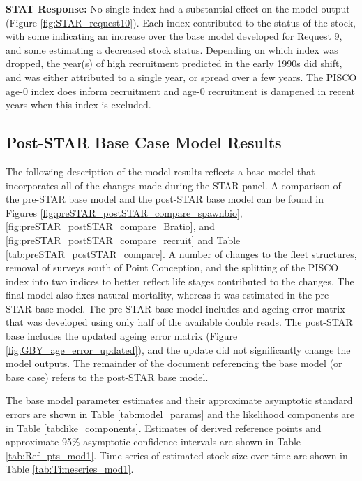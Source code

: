 \documentclass[12pt,]{article}
\begin{document}
\begin{description}[style=sameline]
\textbf{STAT Response:} No single index had a substantial effect on the model output 
(Figure \ref{fig:STAR_request10}). 
Each index contributed to the status of the stock, with some indicating an increase 
over the base model developed for Request 9, and some estimating a decreased stock status. 
Depending on which index was dropped, the year(s) of high recruitment predicted in the 
early 1990s did shift, and was either attributed to a single year, or spread over a few 
years. The PISCO age-0 index does inform recruitment and age-0 recruitment is dampened 
in recent years when this index is excluded.

\end{description}

\subsection{Post-STAR Base Case Model
Results}\label{post-star-base-case-model-results}

The following description of the model results reflects a base model
that incorporates all of the changes made during the STAR panel. A
comparison of the pre-STAR base model and the post-STAR base model can
be found in Figures \ref{fig:preSTAR_postSTAR_compare_spawnbio},
\ref{fig:preSTAR_postSTAR_compare_Bratio}, and
\ref{fig:preSTAR_postSTAR_compare_recruit} and Table
\ref{tab:preSTAR_postSTAR_compare}. A number of changes to the fleet
structures, removal of surveys south of Point Conception, and the
splitting of the PISCO index into two indices to better reflect life
stages contributed to the changes. The final model also fixes natural
mortality, whereas it was estimated in the pre-STAR base model. The
pre-STAR base model includes and ageing error matrix that was developed
using only half of the available double reads. The post-STAR base
includes the updated ageing error matrix (Figure
\ref{fig:GBY_age_error_updated}), and the update did not significantly
change the model outputs. The remainder of the document referencing the
base model (or base case) refers to the post-STAR base model.

The base model parameter estimates and their approximate asymptotic
standard errors are shown in Table \ref{tab:model_params} and the
likelihood components are in Table \ref{tab:like_components}. Estimates
of derived reference points and approximate 95\% asymptotic confidence
intervals are shown in Table \ref{tab:Ref_pts_mod1}. Time-series of
estimated stock size over time are shown in Table
\ref{tab:Timeseries_mod1}.
\end{document}
